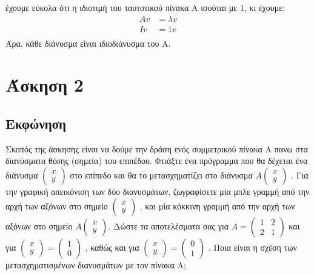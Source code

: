 \documentclass[a4paper,12pt]{article}
\begin{document}
έχουμε εύκολα ότι η ιδιοτιμή του ταυτοτικού  πίνακα Α ισούται με 1, κι έχουμε:
\begin{equation}
    \begin{split}
        A v &= \lambda v \\
        I v&= 1 v \\
    \end{split}
\end{equation}
Άρα, κάθε διάνυσμα είναι ιδιοδιάνυσμα του Α.
\newpage\section{Άσκηση 2}
\subsection{Εκφώνηση}
Σκοπός της άσκησης είναι να δούμε την δράση ενός συμμετρικού πίνακα A πανω στα διανύσματα θέσης (σημεία)
του επιπέδου. Φτιάξτε ένα πρόγραμμα που θα δέχεται ένα διάνυσμα
$
    \begin{pmatrix}
        x \\
        y
    \end{pmatrix}
$
στο επίπεδο και θα το μετασχηματίζει στο διάνυσμα
$
    A
    \begin{pmatrix}
        x \\
        y
    \end{pmatrix}
$
. Για την γραφική απεικόνιση των δύο διανυσμάτων, ζωγραφίσετε μία μπλε γραμμή από την αρχή των αξόνων
στο σημείο
$
    \begin{pmatrix}
        x \\
        y
    \end{pmatrix}
$
, και μία κόκκινη γραμμή από την αρχή των αξόνων στο σημείο
$
    A
    \begin{pmatrix}
        x \\
        y
    \end{pmatrix}
$. Δώστε τα αποτελέσματα σας για
$
    A=\begin{pmatrix}
        1 & 2 \\
        2 & 1
    \end{pmatrix}
$
και για
$
    \begin{pmatrix}
        x \\
        y
    \end{pmatrix}=\begin{pmatrix}
        1 \\
        0
    \end{pmatrix}
$
, καθώς και για
$
    \begin{pmatrix}
        x \\
        y
    \end{pmatrix}=\begin{pmatrix}
        0 \\
        1
    \end{pmatrix}
$
. Ποια είναι η σχέση των μετασχηματισμένων διανυσμάτων με τον πίνακα Α;
\end{document}
